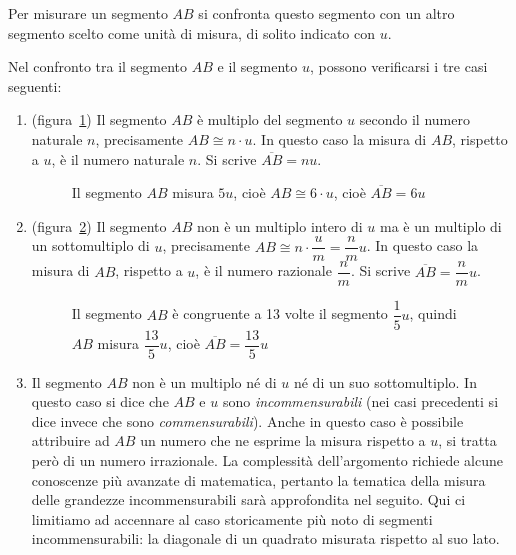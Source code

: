 Per misurare un segmento $AB$ si confronta questo segmento con un 
altro segmento scelto come unità di misura, di solito indicato con 
$u$.

Nel confronto tra il segmento $AB$ e il segmento $u$, possono 
verificarsi i tre casi seguenti:
\begin{enumerate}
\item (figura~\ref{fig:mis_segm1}) Il segmento $AB$ è multiplo del 
segmento $u$ secondo il numero naturale $n$, precisamente $AB\cong 
n\cdot u$. In questo caso la misura di $AB$, rispetto a $u$, è il 
numero naturale $n$. Si scrive $\overline{AB} = nu$.


\begin{inaccessibleblock}
 \begin{figure}[htb]
\centering
\caption{Il segmento $AB$ misura $5u$, cioè $AB\cong 6\cdot u$, cioè 
$\overline{AB}=6u$}\label{fig:mis_segm1}
\end{figure}
\end{inaccessibleblock}

\item (figura~\ref{fig:mis_segm2}) Il segmento $AB$ non è un multiplo 
intero di $u$ ma è un multiplo di un sottomultiplo di $u$, 
precisamente $AB\cong n\cdot \dfrac{u}{m}=\dfrac{n}{m}u$. In questo 
caso la misura di $AB$, rispetto a $u$, è il numero razionale 
$\dfrac{n}{m}$. Si scrive $\overline{AB} = \dfrac{n}{m}u$.


\begin{inaccessibleblock}
 \begin{figure}[htb]
\centering
\caption{Il segmento $AB$ è congruente a 13 volte il segmento 
$\dfrac{1}{5}u$, quindi $AB$ misura $\dfrac{13}{5}u$, cioè 
$\overline{AB}=\dfrac{13}{5}u$}\label{fig:mis_segm2}
\end{figure}
\end{inaccessibleblock}

\item Il segmento $AB$ non è un multiplo né di $u$ né di un suo 
sottomultiplo. In questo caso si dice che $AB$ e $u$ sono 
\emph{incommensurabili} (nei casi precedenti si dice invece che sono 
\emph{commensurabili}). Anche in questo caso è possibile attribuire 
ad $AB$ un numero che ne esprime la misura rispetto a $u$, si tratta 
però di un numero irrazionale. La complessità dell'argomento richiede 
alcune conoscenze più avanzate di matematica, pertanto la tematica 
della misura delle grandezze incommensurabili sarà approfondita nel 
seguito. Qui ci limitiamo ad accennare al caso storicamente più noto 
di segmenti incommensurabili: la diagonale di un quadrato misurata 
rispetto al suo lato.



\end{enumerate}
